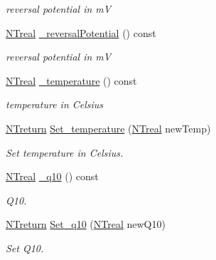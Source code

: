 \begin{DoxyCompactItemize}
\begin{DoxyCompactList}\small\item\em reversal potential in mV \item\end{DoxyCompactList}\item 
\hyperlink{nt__types_8h_a814a97893e9deb1eedcc7604529ba80d}{NTreal} \hyperlink{class_n_t_b_p__membrane__current__o_a3e2d4d421768b48bd669bd2ca6f44223}{\_\-reversalPotential} () const 
\begin{DoxyCompactList}\small\item\em reversal potential in mV \item\end{DoxyCompactList}\item 
\hyperlink{nt__types_8h_a814a97893e9deb1eedcc7604529ba80d}{NTreal} \hyperlink{class_n_t_b_p__membrane__current__o_aeffaa2ba83d01cc3cbf296e0f7013e0b}{\_\-temperature} () const 
\begin{DoxyCompactList}\small\item\em temperature in Celsius \item\end{DoxyCompactList}\item 
\hyperlink{nt__types_8h_ab9564ee8f091e809d21b8451c6683c53}{NTreturn} \hyperlink{class_n_t_b_p__membrane__current__o_a6ab7048d8280b508a2c4eb7a9c32826b}{Set\_\-temperature} (\hyperlink{nt__types_8h_a814a97893e9deb1eedcc7604529ba80d}{NTreal} newTemp)
\begin{DoxyCompactList}\small\item\em Set temperature in Celsius. \item\end{DoxyCompactList}\item 
\hyperlink{nt__types_8h_a814a97893e9deb1eedcc7604529ba80d}{NTreal} \hyperlink{class_n_t_b_p__membrane__current__o_a1d189deafd6e7a52af9d04bb69bccae2}{\_\-q10} () const 
\begin{DoxyCompactList}\small\item\em Q10. \item\end{DoxyCompactList}\item 
\hyperlink{nt__types_8h_ab9564ee8f091e809d21b8451c6683c53}{NTreturn} \hyperlink{class_n_t_b_p__membrane__current__o_a00b49929e39886d1d23b7976847fc2b9}{Set\_\-q10} (\hyperlink{nt__types_8h_a814a97893e9deb1eedcc7604529ba80d}{NTreal} newQ10)
\begin{DoxyCompactList}\small\item\em Set Q10. \item\end{DoxyCompactList}\item 

\end{DoxyCompactItemize}
